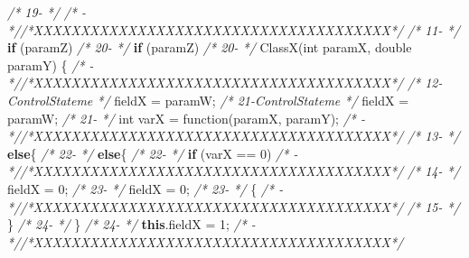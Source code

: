 \documentclass[
]{article}
\newenvironment{Shaded}{\begin{snugshade}}{\end{snugshade}}
\newcommand{\CommentTok}[1]{\textcolor[rgb]{0.56,0.35,0.01}{\textit{#1}}}
\newcommand{\DataTypeTok}[1]{\textcolor[rgb]{0.13,0.29,0.53}{#1}}
\newcommand{\DecValTok}[1]{\textcolor[rgb]{0.00,0.00,0.81}{#1}}
\newcommand{\FunctionTok}[1]{\textcolor[rgb]{0.00,0.00,0.00}{#1}}
\newcommand{\KeywordTok}[1]{\textcolor[rgb]{0.13,0.29,0.53}{\textbf{#1}}}
\newcommand{\NormalTok}[1]{#1}
\begin{document}
\begin{landscape}
\begin{Shaded}
\begin{Highlighting}[]
\CommentTok{/* 19-                 */}                                                               \CommentTok{/*   -                 *//*XXXXXXXXXXXXXXXXXXXXXXXXXXXXXXXXXXXXXX*/}                     
\CommentTok{/* 11-                 */}        \KeywordTok{if}\NormalTok{ (paramZ)                                            }\CommentTok{/* 20-                 */}        \KeywordTok{if}\NormalTok{ (paramZ)                                            }
\CommentTok{/* 20-                 */}    \FunctionTok{ClassX}\NormalTok{(}\DataTypeTok{int}\NormalTok{ paramX, }\DataTypeTok{double}\NormalTok{ paramY) \{                                }\CommentTok{/*   -                 *//*XXXXXXXXXXXXXXXXXXXXXXXXXXXXXXXXXXXXXX*/}                     
\CommentTok{/* 12-ControlStateme   */}\NormalTok{            fieldX = paramW;                                   }\CommentTok{/* 21-ControlStateme   */}\NormalTok{            fieldX = paramW;                                   }
\CommentTok{/* 21-                 */}        \DataTypeTok{int}\NormalTok{ varX = }\FunctionTok{function}\NormalTok{(paramX, paramY);                          }\CommentTok{/*   -                 *//*XXXXXXXXXXXXXXXXXXXXXXXXXXXXXXXXXXXXXX*/}                     
\CommentTok{/* 13-                 */}        \KeywordTok{else}\NormalTok{\{                                                  }\CommentTok{/* 22-                 */}        \KeywordTok{else}\NormalTok{\{                                                  }
\CommentTok{/* 22-                 */}        \KeywordTok{if}\NormalTok{ (varX == }\DecValTok{0}\NormalTok{)                                         }\CommentTok{/*   -                 *//*XXXXXXXXXXXXXXXXXXXXXXXXXXXXXXXXXXXXXX*/}                     
\CommentTok{/* 14-                 */}\NormalTok{            fieldX = }\DecValTok{0}\NormalTok{;                                        }\CommentTok{/* 23-                 */}\NormalTok{            fieldX = }\DecValTok{0}\NormalTok{;                                        }
\CommentTok{/* 23-                 */}\NormalTok{        \{                                                      }\CommentTok{/*   -                 *//*XXXXXXXXXXXXXXXXXXXXXXXXXXXXXXXXXXXXXX*/}                     
\CommentTok{/* 15-                 */}\NormalTok{        \}                                                      }\CommentTok{/* 24-                 */}\NormalTok{        \}                                                      }
\CommentTok{/* 24-                 */}            \KeywordTok{this}\NormalTok{.}\FunctionTok{fieldX}\NormalTok{ = }\DecValTok{1}\NormalTok{;                                   }\CommentTok{/*   -                 *//*XXXXXXXXXXXXXXXXXXXXXXXXXXXXXXXXXXXXXX*/}                     

\end{Highlighting}
\end{Shaded}
\end{landscape}
\end{document}
